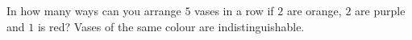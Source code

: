 In how many ways can you arrange $5$ vases in a row if $2$ are orange, $2$ are purple and $1$ is red? Vases of the same colour are indistinguishable.
